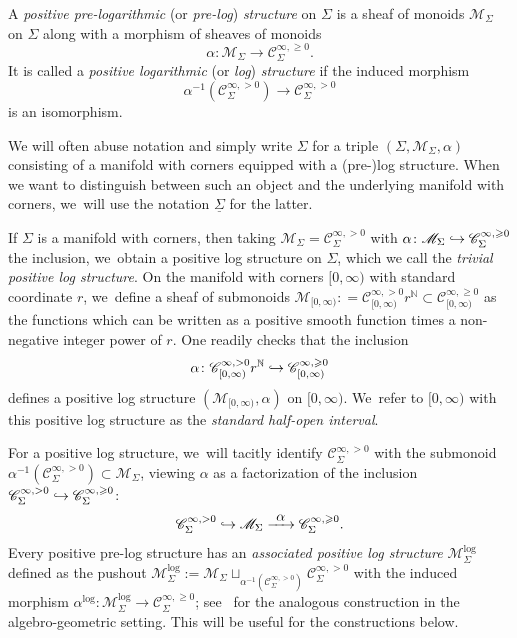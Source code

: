 \documentclass[JEP,XML,SOM,Unicode,NoFloatCountersInSection,published]{cedram}
\newcommand\hto{\mathrel{\lhook\joinrel\to}}
\newcommand{\To}[1]{\mathchoice{\xrightarrow{\textstyle\kern4pt#1\kern3pt}}{\stackrel{#1}{\longrightarrow}}{}{}}
\theoremstyle{definition}
\theoremstyle{remark}
\newenvironment{example}
  {\pushQED{\qed}\renewcommand{\qedsymbol}{$\lozenge$}\examplex}
  {\popQED\endexamplex}
\let\defn\emph
\newcommand{\NN}{\mathbb{N}}
\newcommand{\halfspc}[1]{[0,\infty)^{#1}}
\renewcommand{\ge}{\geqslant}
\newcommand{\defas}{\mathrel{\mathop:}=}
\newcommand{\cM}{\mathscr{M}}
\newcommand{\Cinfpos}[1]{\mathscr{C}^{\infty, > 0}_{#1}}
\newcommand{\Cinfge}[1]{\mathscr{C}^{\infty, \ge 0}_{#1}}
\newcommand{\Sig}{\Sigma}
\newcommand{\uSig}{\underline{\Sigma}}
\begin{document}
\begin{definition}
A \defn{positive pre-logarithmic} (or \defn{pre-log}) \defn{structure} on $\Sig$ is a sheaf of monoids $\cM_\Sig$ on $\Sig$ along with a morphism of sheaves of monoids
\[
\alpha\colon \cM_\Sig\to \Cinfge{\Sig}.
\]
It is called a \defn{positive logarithmic} (or \defn{log}) \defn{structure} if the induced morphism
\[
\alpha^{-1}(\Cinfpos{\Sig})\to \Cinfpos{\Sig}
\]
is an isomorphism.
\end{definition}
We will often abuse notation and simply write $\Sig$ for a triple $(\Sig,\cM_\Sig,\alpha)$ consisting of a manifold with corners equipped with a (pre-)log structure. When we want to distinguish between such an object and the underlying manifold with corners, we~will use the notation $\uSig$ for the latter.

\begin{example}\label{ex:trivial}
If $\Sig$ is a manifold with corners, then taking $\cM_{\Sig} = \Cinfpos{\Sig}$ with $\alpha\colon \cM_{\Sig} \hto \Cinfge{\Sig}$ the inclusion, we~obtain a positive log structure on $\Sig$, which we call the \defn{trivial positive log structure}.
\end{example}
\begin{example}\label{ex:interval}
On the manifold with corners $[0,\infty)$ with standard coordinate $r$, we~define a sheaf of submonoids $\cM_{[0,\infty)}\defas \Cinfpos{[0,\infty)}r^{\NN}\subset \Cinfge{\halfspc{}}$ as the functions which can be written as a positive smooth function times a non-negative integer power of $r$. One readily checks that the inclusion\vspace*{-3pt}
\[
\alpha\colon \Cinfpos{[0,\infty)}r^\NN \hto \Cinfge{[0,\infty)}
\]
defines a positive log structure $(\cM_{\halfspc{}},\alpha)$ on $[0,\infty)$. We~refer to $[0,\infty)$ with this positive log structure as the \defn{standard half-open interval}.
\end{example}

For a positive log structure, we~will tacitly identify $\Cinfpos{\Sig}$ with the submonoid $\alpha^{-1}(\Cinfpos{\Sig}) \subset \cM_\Sig$, viewing $\alpha$ as a factorization of the inclusion $\Cinfpos{\Sig} \hto\Cinfge{\Sig}$:\vspace*{-3pt}
\[
\Cinfpos{\Sig}\hto \cM_\Sig \To{\alpha} \Cinfge{\Sig}.
\]
Every positive pre-log structure has an \defn{associated positive log structure} $\cM_{\Sig}^{\log}$ defined as the pushout $\cM_{\Sig}^{\log} := \cM_{\Sig} \sqcup_{\alpha^{-1}(\Cinfpos{\Sig})} \Cinfpos{\Sig}$
with the induced morphism $\alpha^{\log }: \cM_{\Sig}^{\log} \to \Cinfge{\Sig}$; see~\cite[\S{}I.1.1 and \S{}III.1.1.3]{Ogus} for the analogous construction in the algebro-geometric setting. This will be useful for the constructions below.
\end{document}
